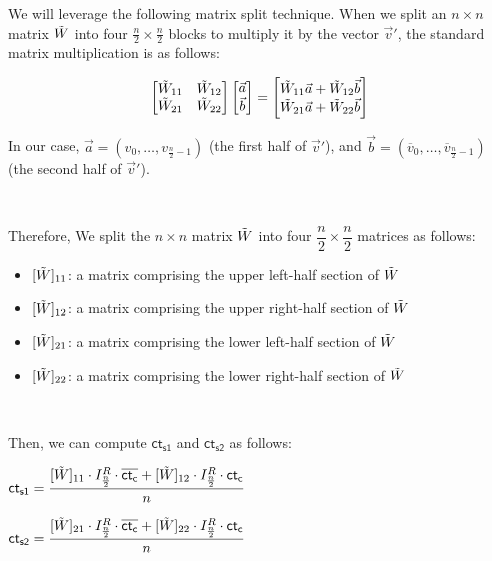 We will leverage the following matrix split technique. When we split an $n \times n$ matrix $\tilde{W}$ into four $\frac{n}{2} \times \frac{n}{2}$ blocks to multiply it by the vector $\vec{v}'$, the standard matrix multiplication is as follows:

$$\begin{bmatrix} \tilde{W}_{11} & \tilde{W}_{12} \\ \tilde{W}_{21} & \tilde{W}_{22} \end{bmatrix} \begin{bmatrix} \vec{a} \\ \vec{b} \end{bmatrix} = \begin{bmatrix} \tilde{W}_{11}\vec{a} + \tilde{W}_{12}\vec{b} \\ \tilde{W}_{21}\vec{a} + \tilde{W}_{22}\vec{b} \end{bmatrix}$$

In our case, $\vec{a} = (v_0, \dots, v_{\frac{n}{2}-1})$ (the first half of $\vec{v}'$), and $\vec{b} = (\overline{v}_0, \dots, \overline{v}_{\frac{n}{2}-1})$ (the second half of $\vec{v}'$).

$ $

Therefore, We split the $n \times n$ matrix $\tilde W$ into four $\dfrac{n}{2} \times \dfrac{n}{2}$ matrices as follows:

\begin{itemize}
\item $[\tilde W]_{11}$: a matrix comprising the upper left-half section of $\tilde W$
\item $[\tilde W]_{12}$: a matrix comprising the upper right-half section of $\tilde W$
\item $[\tilde W]_{21}$: a matrix comprising the lower left-half section of $\tilde W$
\item $[\tilde W]_{22}$: a matrix comprising the lower right-half section of $\tilde W$
\end{itemize}

$ $

Then, we can compute $\textsf{ct}_{\textsf{s1}}$ and $\textsf{ct}_{\textsf{s2}}$ as follows:

$\textsf{ct}_{\textsf{s1}} = \dfrac{[\tilde W]_{11} \cdot I_{\frac{n}{2}}^R \cdot \mathit{\overline{\textsf{ct\textsubscript{c}}}} + [\tilde W]_{12} \cdot I_{\frac{n}{2}}^R \cdot \textsf{ct\textsubscript{c}}}{n}$

$\textsf{ct}_{\textsf{s2}} = \dfrac{[\tilde W]_{21} \cdot I_{\frac{n}{2}}^R \cdot \mathit{\overline{\textsf{ct\textsubscript{c}}}} + [\tilde W]_{22} \cdot I_{\frac{n}{2}}^R \cdot \textsf{ct\textsubscript{c}}}{n}$



